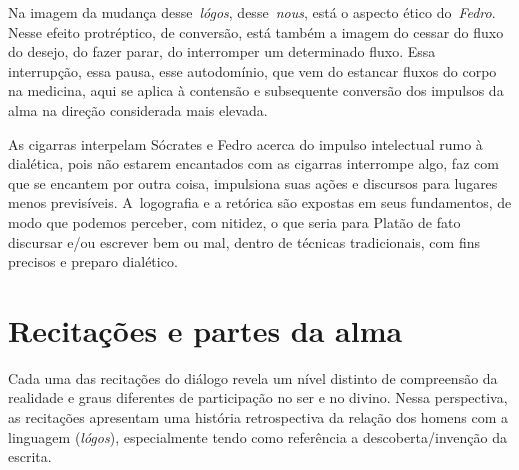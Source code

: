 Na imagem da mudança desse~\emph{lógos}, desse~\emph{nous}, está o
aspecto ético do~\emph{Fedro}. Nesse efeito protréptico, de conversão,
está também a imagem do cessar do fluxo do desejo, do fazer parar, do
interromper um determinado fluxo. Essa interrupção, essa pausa, esse
autodomínio, que vem do estancar fluxos do corpo na medicina, aqui se
aplica à contensão e subsequente conversão dos impulsos da alma na
direção considerada mais elevada.

As cigarras interpelam Sócrates e Fedro acerca do impulso intelectual
rumo à dialética, pois não estarem encantados com as cigarras interrompe
algo, faz com que se encantem por outra coisa, impulsiona suas ações e
discursos para lugares menos previsíveis. A~logografia e a retórica são
expostas em seus fundamentos, de modo que podemos perceber, com nitidez,
o que seria para Platão de fato discursar e/\allowbreak{}ou escrever bem ou mal,
dentro de técnicas tradicionais, com fins precisos e preparo dialético.

 

\section{Recitações e partes da alma}

 

Cada uma das recitações do diálogo revela um nível distinto de
compreensão da realidade e graus diferentes de participação no ser e no
divino. Nessa perspectiva, as recitações apresentam uma história
retrospectiva da relação dos homens com a linguagem (\emph{lógos}),
especialmente tendo como referência a descoberta/\allowbreak{}invenção da escrita.


